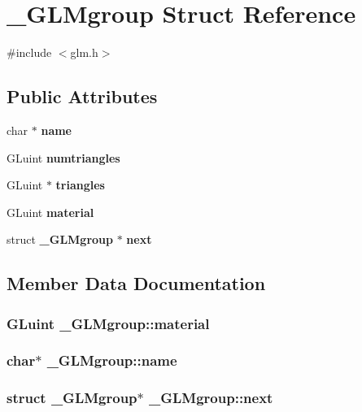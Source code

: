 \section{\-\_\-\-G\-L\-Mgroup Struct Reference}
\label{struct___g_l_mgroup}


{\ttfamily \#include $<$glm.\-h$>$}

\subsection*{Public Attributes}
\begin{DoxyCompactItemize}
\item 
char $\ast$ {\bf name}
\item 
G\-Luint {\bf numtriangles}
\item 
G\-Luint $\ast$ {\bf triangles}
\item 
G\-Luint {\bf material}
\item 
struct {\bf \-\_\-\-G\-L\-Mgroup} $\ast$ {\bf next}
\end{DoxyCompactItemize}


\subsection{Member Data Documentation}
\subsubsection[{material}]{\setlength{\rightskip}{0pt plus 5cm}G\-Luint \-\_\-\-G\-L\-Mgroup\-::material}\label{struct___g_l_mgroup_a3127ad008b432a5a1fcdc4cde924bd5e}
\subsubsection[{name}]{\setlength{\rightskip}{0pt plus 5cm}char$\ast$ \-\_\-\-G\-L\-Mgroup\-::name}\label{struct___g_l_mgroup_a17de10f71e980597335b72790acd6ec1}
\subsubsection[{next}]{\setlength{\rightskip}{0pt plus 5cm}struct {\bf \-\_\-\-G\-L\-Mgroup}$\ast$ \-\_\-\-G\-L\-Mgroup\-::next}\label{struct___g_l_mgroup_a36bec6ef13eb38672c7bcd6d79681945}
